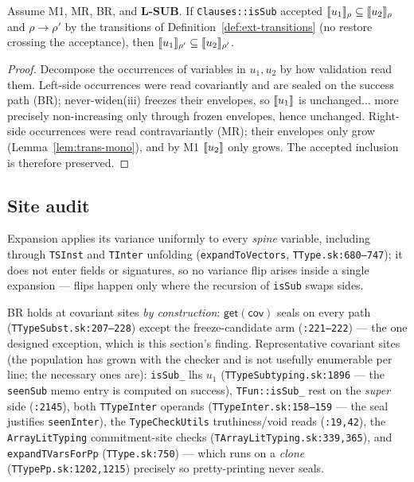 \documentclass[11pt]{article}
\begin{document}
\begin{theorem}
\label{thm:stable}
Assume M1, MR, BR, and \textbf{L-SUB}. If \texttt{Clauses::isSub}
accepted $\llbracket u_1 \rrbracket_\rho \subseteq \llbracket u_2 \rrbracket_\rho$ and
$\rho \to \rho'$ by the transitions of
Definition~\ref{def:ext-transitions} (no restore crossing the
acceptance), then $\llbracket u_1 \rrbracket_{\rho'} \subseteq \llbracket u_2 \rrbracket_{\rho'}$.
\end{theorem}
\begin{proof}
Decompose the occurrences of variables in $u_1, u_2$ by how validation
read them. Left-side occurrences were read covariantly and are sealed on
the success path (BR); never-widen(iii) freezes their envelopes, so
$\llbracket u_1 \rrbracket$ is unchanged... more precisely non-increasing only through
frozen envelopes, hence unchanged. Right-side occurrences were read
contravariantly (MR); their envelopes only grow
(Lemma~\ref{lem:trans-mono}), and by M1 $\llbracket u_2 \rrbracket$ only grows. The
accepted inclusion is therefore preserved.
\end{proof}

\subsection{Site audit}
\label{sec:mr-audit}

Expansion applies its variance uniformly
to every \emph{spine} variable, including through \texttt{TSInst} and
\texttt{TInter} unfolding (\texttt{expandToVectors},
\texttt{TType.sk:680--747}); it does not enter
fields or signatures, so no variance flip arises inside a single
expansion — flips happen only where the recursion of \texttt{isSub}
swaps sides.

BR holds at covariant sites \emph{by construction}:
$\mathsf{get}(\mathsf{cov})$ seals on every path
(\texttt{TTypeSubst.sk:207--228}) except the freeze-candidate arm
(\texttt{:221--222}) — the one designed exception, which is this
section's finding. Representative covariant sites (the population has
grown with the checker and is not usefully enumerable per line; the
necessary ones are): \texttt{isSub\_} lhs $u_1$
(\texttt{TTypeSubtyping.sk:1896} — the \texttt{seenSub} memo entry is computed on
success), \texttt{TFun::isSub\_} rest on the \emph{super} side
(\texttt{:2145}), both \texttt{TTypeInter} operands
(\texttt{TTypeInter.sk:158--159} — the seal justifies
\texttt{seenInter}), the \texttt{TypeCheckUtils} truthiness/void reads
(\texttt{:19,42}), the \texttt{ArrayLitTyping} commitment-site checks
(\texttt{TArrayLitTyping.sk:339,365}), and \texttt{expandTVarsForPp}
(\texttt{TType.sk:750}) — which runs on a \emph{clone}
(\texttt{TTypePp.sk:1202,1215}) precisely so pretty-printing never
seals.
\end{document}
